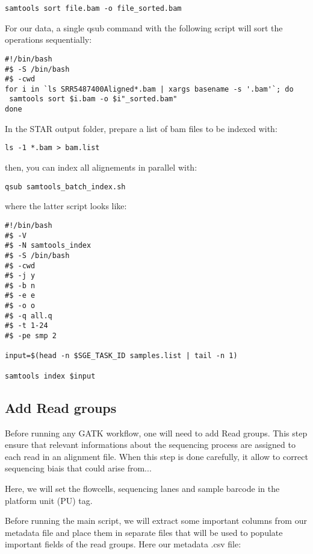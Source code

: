 \begin{verbatim}
samtools sort file.bam -o file_sorted.bam
\end{verbatim}

For our data, a single qsub command with the following script will sort the operations sequentially:


\begin{verbatim}
#!/bin/bash
#$ -S /bin/bash
#$ -cwd
for i in `ls SRR5487400Aligned*.bam | xargs basename -s '.bam'`; do
 samtools sort $i.bam -o $i"_sorted.bam"
done 
\end{verbatim}


In the STAR output folder, prepare a list of bam files to be indexed with:

\begin{verbatim}
ls -1 *.bam > bam.list
\end{verbatim}

then, you can index all alignements in parallel with:

\begin{verbatim}
qsub samtools_batch_index.sh
\end{verbatim}

where the latter script looks like:

\begin{verbatim}
#!/bin/bash
#$ -V
#$ -N samtools_index
#$ -S /bin/bash
#$ -cwd
#$ -j y
#$ -b n
#$ -e e
#$ -o o
#$ -q all.q
#$ -t 1-24
#$ -pe smp 2

input=$(head -n $SGE_TASK_ID samples.list | tail -n 1)

samtools index $input
\end{verbatim}





\subsection{Add Read groups}

Before running any GATK workflow, one will need to add Read groups. This step ensure that relevant informations about the sequencing process are assigned to each read in an alignment file. When this step is done carefully, it allow to correct sequencing biais that could arise from...


Here, we will set the flowcells, sequencing lanes and sample barcode in the platform unit (PU) tag.

Before running the main script, we will extract some important columns from our metadata file and place them in separate files that will be used to populate important fields of the read groups. Here our metadata .csv file:

